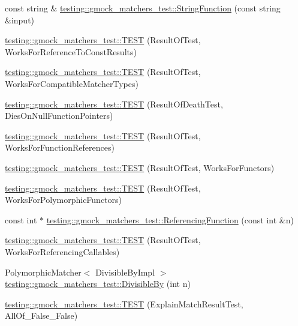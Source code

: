 \begin{DoxyCompactItemize}
\item 
const string \& \hyperlink{namespacetesting_1_1gmock__matchers__test_a5fdf1ecaf8e8e8ef5d57c311e675841d}{testing\+::gmock\+\_\+matchers\+\_\+test\+::\+String\+Function} (const string \&input)
\item 
\hyperlink{namespacetesting_1_1gmock__matchers__test_a17b952cce22be6338fb1369f886d61c4}{testing\+::gmock\+\_\+matchers\+\_\+test\+::\+T\+E\+ST} (Result\+Of\+Test, Works\+For\+Reference\+To\+Const\+Results)
\item 
\hyperlink{namespacetesting_1_1gmock__matchers__test_a1aceb307c843f0f5532053e390a7c654}{testing\+::gmock\+\_\+matchers\+\_\+test\+::\+T\+E\+ST} (Result\+Of\+Test, Works\+For\+Compatible\+Matcher\+Types)
\item 
\hyperlink{namespacetesting_1_1gmock__matchers__test_a4c929e5b46a503a9bb48c8b88dcbbf2a}{testing\+::gmock\+\_\+matchers\+\_\+test\+::\+T\+E\+ST} (Result\+Of\+Death\+Test, Dies\+On\+Null\+Function\+Pointers)
\item 
\hyperlink{namespacetesting_1_1gmock__matchers__test_a1638ee6460100cbe21c65b6cdc06579a}{testing\+::gmock\+\_\+matchers\+\_\+test\+::\+T\+E\+ST} (Result\+Of\+Test, Works\+For\+Function\+References)
\item 
\hyperlink{namespacetesting_1_1gmock__matchers__test_a19b7a39915f7ad5a0b741caf7ae4e619}{testing\+::gmock\+\_\+matchers\+\_\+test\+::\+T\+E\+ST} (Result\+Of\+Test, Works\+For\+Functors)
\item 
\hyperlink{namespacetesting_1_1gmock__matchers__test_a976290e53e319b06c51a94f7e450d765}{testing\+::gmock\+\_\+matchers\+\_\+test\+::\+T\+E\+ST} (Result\+Of\+Test, Works\+For\+Polymorphic\+Functors)
\item 
const int $\ast$ \hyperlink{namespacetesting_1_1gmock__matchers__test_af3164fc302e0b727c1eb745bdeb959f6}{testing\+::gmock\+\_\+matchers\+\_\+test\+::\+Referencing\+Function} (const int \&n)
\item 
\hyperlink{namespacetesting_1_1gmock__matchers__test_a00ee08657c9e9e0c306be7b84cd2848c}{testing\+::gmock\+\_\+matchers\+\_\+test\+::\+T\+E\+ST} (Result\+Of\+Test, Works\+For\+Referencing\+Callables)
\item 
Polymorphic\+Matcher$<$ Divisible\+By\+Impl $>$ \hyperlink{namespacetesting_1_1gmock__matchers__test_ac5b1fd3b6a8141c7e83ef6040ed4630f}{testing\+::gmock\+\_\+matchers\+\_\+test\+::\+Divisible\+By} (int n)
\item 
\hyperlink{namespacetesting_1_1gmock__matchers__test_aa9a60a406d9f495de8c8552abf577dd1}{testing\+::gmock\+\_\+matchers\+\_\+test\+::\+T\+E\+ST} (Explain\+Match\+Result\+Test, All\+Of\+\_\+\+False\+\_\+\+False)

\end{DoxyCompactItemize}
